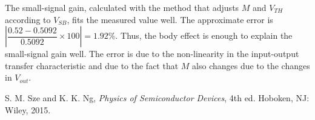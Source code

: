 \documentclass[a4paper, itemph]{oblivoir}
\theoremstyle{definition}
\begin{document}
The small-signal gain, calculated with the method that adjusts $M$ and $V_{TH}$ according to $V_{SB}$, fits the measured value well. The approximate error is $\left|\dfrac{0.52-0.5092}{0.5092}\times 100\right|=1.92\%$. Thus, the body effect is enough to explain the small-signal gain well. The error is due to the non-linearity in the input-output transfer characteristic and due to the fact that $M$ also changes due to the changes in $V_{out}$.
\begin{thebibliography}{}

 S. M. Sze and K. K. Ng, \textit{Physics of Semiconductor Devices}, 4th ed. Hoboken, NJ: Wiley, 2015.

\end{thebibliography}
\end{document}
